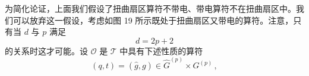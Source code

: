 
为简化论证，上面我们假设了扭曲扇区算符不带电、带电算符不在扭曲扇区中。我们可以放弃这一假设，考虑如图 19 所示既处于扭曲扇区又带电的算符。注意，只有当 $d$ 与 $p$ 满足
\begin{equation}
d=2p+2
\tag{4.183}
\end{equation}
的关系时这才可能。设 $\mathcal{O}$ 是 $\mathcal{T}$ 中具有下述性质的算符
\begin{equation}
(q,t)=(\widehat{g},g)\in\widehat{G}^{(p)}\times G^{(p)}\,,
\tag{4.184}
\end{equation}

